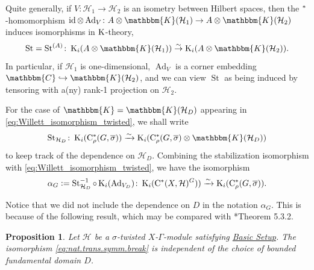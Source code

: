 \documentclass{amsart}
\numberwithin{figure}{section}
\numberwithin{equation}{section}
\numberwithin{table}{section}
\theoremstyle{plain}
\newtheorem{proposition}[equation]{Proposition}
\theoremstyle{definition}
\theoremstyle{remark}
\theoremstyle{nonumber}
\newcommand{\refbasicsetup}{\hyperref[basic_setup]{Basic Setup}}
\newcommand{\C}{\mathbb{C}}
\newcommand{\Cpt}{\mathbb{K}}
\newcommand{\K}{\relax\ifmmode\operatorname{K}\else\textup{K}\fi}
\newcommand{\st}{\relax\ifmmode{}^*\else{}\textup{*}\fi}
\newcommand{\Cst}{\relax\ifmmode\mathrm{C}^*\else\textup{C*}\fi}
\newcommand{\Cstr}{\Cst_\rho} %
\newcommand{\Stab}{\operatorname{St}} %
\newcommand{\Ad}{\operatorname{Ad}} %
\newcommand{\id}{\operatorname{id}} %
\newcommand{\defeq}{\mathrel{\vcentcolon=}}
\renewcommand{\mathbb}{\mathbbm} %
\begin{document}
Quite generally, if \( V\colon \mathcal{H}_1\to\mathcal{H}_2\) is an
isometry between Hilbert
spaces, then the $\st$-homomorphism \( \id\otimes\Ad_{V}\colon
A\otimes\Cpt(\mathcal{H}_1)\to A\otimes\Cpt(\mathcal{H}_2) \) induces
isomorphisms in $\K$-theory,
\begin{equation}\label{eq:isometry.stabilization}
\Stab=\Stab^{(A)}\colon \K_i(A\otimes\Cpt(\mathcal{H}_1))\overset{\sim}{\to} \K_i(A\otimes\Cpt(\mathcal{H}_2)).
\end{equation}
In particular, if $\mathcal{H}_1$ is one-dimensional, $\Ad_V$ is a corner
embedding \( \C\hookrightarrow \Cpt(\mathcal{H}_2) \), 
and we can view
$\Stab$ as being induced by tensoring with a(ny) rank-1 projection on
$\mathcal{H}_2$.

For the case of $\Cpt=\Cpt(\mathcal{H}_D)$ appearing in
\eqref{eq:Willett_isomorphism_twisted}, we shall write
\[
\Stab_{\mathcal{H}_D}\colon \K_i(\Cstr(G,\overline{\sigma}))\xrightarrow{\sim}\K_i(\Cstr(G,\overline{\sigma})\otimes\Cpt(\mathcal{H}_D))
\]
to keep track of the dependence on $\mathcal{H}_D$. Combining the stabilization isomorphism with \eqref{eq:Willett_isomorphism_twisted}, we have the isomorphism
\begin{equation}\label{eq:nat.trans.symm.break}
\alpha_G\defeq \Stab_{\mathcal{H}_D}^{-1}\circ \K_i(\Ad_{V_{D}})\colon \K_i(\Cst(X,\mathcal{H})^{G}))\xrightarrow{\sim} \K_i(\Cstr(G,\overline{\sigma})).
\end{equation}

Notice that we did not include the dependence on $D$ in the notation $\alpha_G$. This is because of the following result, which may be compared with \cite{Willett-Yu:Higher_index_theory}*{Theorem 5.3.2}.

\begin{proposition}\label{prop:equiv_Roe_decomp_K_canonical}
Let $\mathcal{H}$ be a $\sigma$-twisted $X$-$\Gamma$-module satisfying
\refbasicsetup. The
isomorphism \eqref{eq:nat.trans.symm.break}
is independent of the choice of bounded fundamental domain $D$.
\end{proposition}
\end{document}
